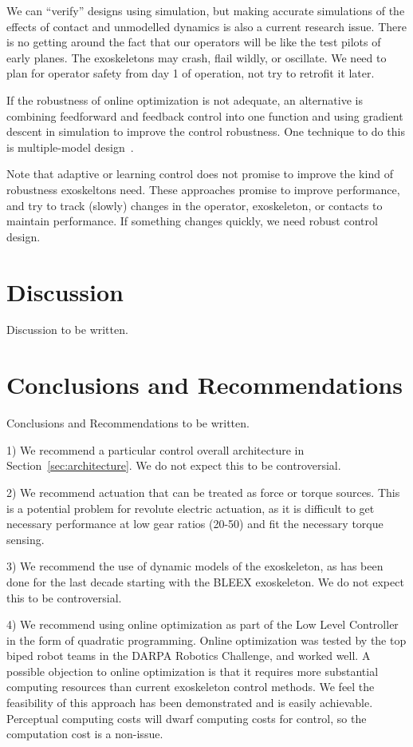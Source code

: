 \documentclass[letterpaper,12pt,fullpage]{article}
\begin{document}
We can ``verify'' designs using simulation, but making accurate simulations of
the effects of contact and unmodelled dynamics is also a current research issue.
There is no getting around the fact that our operators will be like the test
pilots of early planes. The exoskeletons may crash, flail wildly, or oscillate.
We need to plan for operator safety from day 1 of operation, not try to retrofit
it later.

If the robustness of online optimization is not adequate, an alternative is
combining feedforward and feedback control into one function and using gradient
descent in simulation to improve the control robustness.
One technique to do this is multiple-model design~\cite{acc12}.

Note that adaptive or learning
control does not promise to improve the kind of robustness exoskeltons need. 
These approaches promise
to improve performance, and try to track (slowly) changes in the operator, exoskeleton,
or contacts to maintain performance. If something changes quickly, we need robust
control design.

\section{Discussion}

Discussion to be written.

\section{Conclusions and Recommendations}

Conclusions and Recommendations to be written.

1) We recommend a particular control 
overall architecture in Section~\ref{sec:architecture}.
We do not expect this to be controversial.

2) We recommend actuation that can be treated as force or torque sources.
This is a potential problem for revolute electric actuation, as it
is difficult to get necessary performance at low gear ratios (20-50)
and fit the necessary torque sensing.

3) We recommend the use of dynamic models of the exoskeleton, as has been done
for the last decade starting with the BLEEX exoskeleton.
We do not expect this to be controversial.

4) We recommend using online optimization as part of the Low Level Controller
in the form of quadratic programming. Online optimization
was tested by the top biped robot
teams in the DARPA Robotics Challenge, and worked well.
A possible objection to online optimization
is that it requires more substantial computing
resources than current exoskeleton control methods. We feel the feasibility
of this approach has been demonstrated and is easily achievable. Perceptual
computing costs will dwarf computing costs for control, 
so the computation cost is a non-issue.
\end{document}
